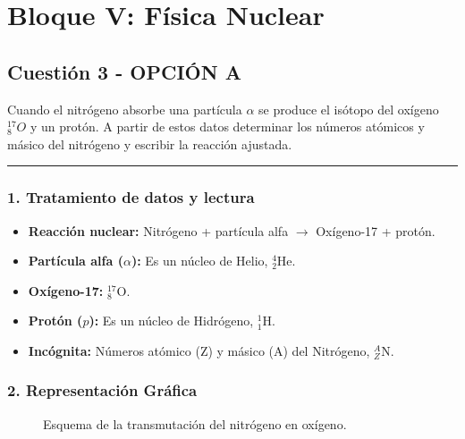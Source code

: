 \newpage

\section{Bloque V: Física Nuclear}
\label{sec:nuclear_2005_jun_cv}

\subsection{Cuestión 3 - OPCIÓN A}
\label{subsec:5A_2005_jun_cv}

\begin{cajaenunciado}
Cuando el nitrógeno absorbe una partícula $\alpha$ se produce el isótopo del oxígeno ${}_{8}^{17}O$ y un protón. A partir de estos datos determinar los números atómicos y másico del nitrógeno y escribir la reacción ajustada.
\end{cajaenunciado}
\hrule

\subsubsection*{1. Tratamiento de datos y lectura}
\begin{itemize}
    \item \textbf{Reacción nuclear:} Nitrógeno + partícula alfa $\rightarrow$ Oxígeno-17 + protón.
    \item \textbf{Partícula alfa ($\alpha$):} Es un núcleo de Helio, ${}_{2}^{4}\text{He}$.
    \item \textbf{Oxígeno-17:} ${}_{8}^{17}\text{O}$.
    \item \textbf{Protón ($p$):} Es un núcleo de Hidrógeno, ${}_{1}^{1}\text{H}$.
    \item \textbf{Incógnita:} Números atómico (Z) y másico (A) del Nitrógeno, ${}_{Z}^{A}\text{N}$.
\end{itemize}

\subsubsection*{2. Representación Gráfica}
\begin{figure}[H]
    \centering
    \caption{Esquema de la transmutación del nitrógeno en oxígeno.}
\end{figure}

